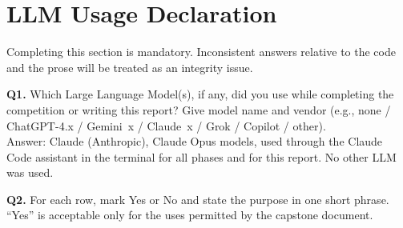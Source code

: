 \documentclass[11pt, oneside]{article}
\begin{document}
\clearpage
\section*{LLM Usage Declaration}\label{sec:llm}
Completing this section is mandatory. Inconsistent answers relative to the code and the prose will be treated as an integrity issue.

\medskip
\noindent
\textbf{Q1.} Which Large Language Model(s), if any, did you use while completing the competition or writing this report? Give model name and vendor (e.g., none / ChatGPT-4.x / Gemini~x / Claude~x / Grok / Copilot / other). \\[0.6em]
Answer: Claude (Anthropic), Claude Opus models, used through the Claude Code assistant in the terminal for all
phases and for this report.  No other LLM was used.

\medskip
\noindent
\textbf{Q2.} For each row, mark Yes or No and state the purpose in one short phrase. ``Yes'' is acceptable only for the uses permitted by the capstone document.
\end{document}
